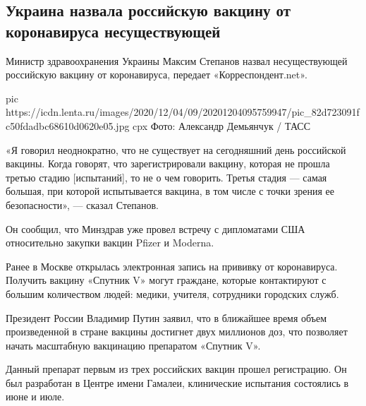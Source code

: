 
 
 
 
 
 
\subsection{Украина назвала российскую вакцину от коронавируса несуществующей}
\label{sec:04_12_2020.news.ru.lenta_ru.4.ukraine_vaccine_non_existent}

Министр здравоохранения Украины Максим Степанов назвал несуществующей
российскую вакцину от коронавируса, передает «Корреспондент.net».


\ifcmt
pic https://icdn.lenta.ru/images/2020/12/04/09/20201204095759947/pic_82d723091fc50fdadbc68610d0620e05.jpg
cpx Фото: Александр Демьянчук / ТАСС
\fi

«Я говорил неоднократно, что не существует на сегодняшний день российской
вакцины. Когда говорят, что зарегистрировали вакцину, которая не прошла третью
стадию [испытаний], то не о чем говорить. Третья стадия — самая большая, при
которой испытывается вакцина, в том числе с точки зрения ее безопасности», —
сказал Степанов.

Он сообщил, что Минздрав уже провел встречу с дипломатами США относительно
закупки вакцин Pfizer и Moderna.

Ранее в Москве открылась электронная запись на прививку от коронавируса.
Получить вакцину «Спутник V» могут граждане, которые контактируют с большим
количеством людей: медики, учителя, сотрудники городских служб.

Президент России Владимир Путин заявил, что в ближайшее время объем
произведенной в стране вакцины достигнет двух миллионов доз, что позволяет
начать масштабную вакцинацию препаратом «Спутник V».

Данный препарат первым из трех российских вакцин прошел регистрацию. Он был
разработан в Центре имени Гамалеи, клинические испытания состоялись в июне и
июле.
